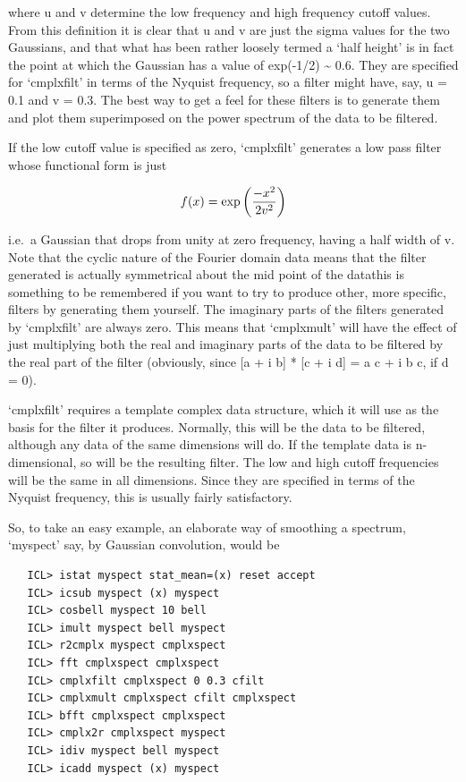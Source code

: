    where u and v determine the low frequency and high frequency cutoff
   values. From this definition it is clear that u and v are just the
   sigma values for the two Gaussians, and that what has been rather
   loosely termed a `half height' is in fact the point at which the
   Gaussian has a value of exp(-1/2) \~{} 0.6. They are specified for
   `cmplxfilt' in terms of the Nyquist frequency, so a filter might
   have, say, u = 0.1 and v = 0.3. The best way to get a feel for these
   filters is to generate them and plot them superimposed on the power
   spectrum of the data to be filtered.

   If the low cutoff value is specified as zero, `cmplxfilt' generates
   a low pass filter whose functional form is just

\begin{displaymath}
   f(x) = \exp{\left({{-x^2}\over{2 v^2}}\right)}
\end{displaymath}

   i.e.\ a Gaussian that drops from unity at zero frequency, having a
   half width of v.  Note that the cyclic nature of the Fourier domain
   data means that the filter generated is actually symmetrical about
   the mid point of the data\latorhtm{---}{-}this is something to be
   remembered if you
   want to try to produce other, more specific, filters by generating
   them yourself. The imaginary parts of the filters generated by
   `cmplxfilt' are always zero.  This means that `cmplxmult' will have
   the effect of just multiplying both the real and imaginary parts of
   the data to be filtered by the real part of the filter (obviously,
   since [a + i b] * [c + i d] = a c + i b c, if d = 0).

   `cmplxfilt' requires a template complex data structure, which it will
   use as the basis for the filter it produces.  Normally, this will be
   the data to be filtered, although any data of the same dimensions
   will do. If the template data is n-dimensional, so will be the
   resulting filter.  The low and high cutoff frequencies will be the
   same in all dimensions.  Since they are specified in terms of the
   Nyquist frequency, this is usually fairly satisfactory.

   So, to take an easy example, an elaborate way of smoothing a
   spectrum, `myspect' say, by Gaussian convolution, would be

\begin{verbatim}
   ICL> istat myspect stat_mean=(x) reset accept
   ICL> icsub myspect (x) myspect
   ICL> cosbell myspect 10 bell
   ICL> imult myspect bell myspect
   ICL> r2cmplx myspect cmplxspect
   ICL> fft cmplxspect cmplxspect
   ICL> cmplxfilt cmplxspect 0 0.3 cfilt
   ICL> cmplxmult cmplxspect cfilt cmplxspect
   ICL> bfft cmplxspect cmplxspect
   ICL> cmplx2r cmplxspect myspect
   ICL> idiv myspect bell myspect
   ICL> icadd myspect (x) myspect
\end{verbatim}

